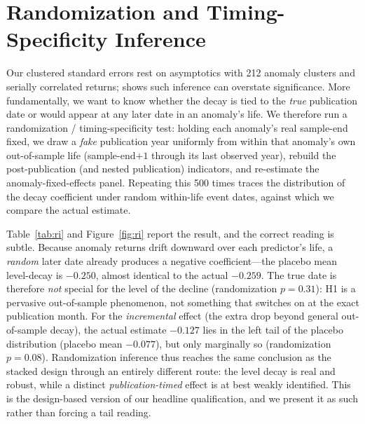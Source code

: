 \documentclass[12pt]{article}
\begin{document}
\section{Randomization and Timing-Specificity Inference}\label{sec:ri}
Our clustered standard errors rest on asymptotics with 212 anomaly clusters and serially
correlated returns; \citet{young2019} shows such inference can overstate significance. More
fundamentally, we want to know whether the decay is tied to the \emph{true} publication date or
would appear at any later date in an anomaly's life. We therefore run a randomization /
timing-specificity test: holding each anomaly's real sample-end fixed, we draw a \emph{fake}
publication year uniformly from within that anomaly's own out-of-sample life
(sample-end$+1$ through its last observed year), rebuild the post-publication (and nested
publication) indicators, and re-estimate the anomaly-fixed-effects panel. Repeating this 500
times traces the distribution of the decay coefficient under random within-life event dates,
against which we compare the actual estimate.

Table~\ref{tab:ri} and Figure~\ref{fig:ri} report the result, and the correct reading is
subtle. Because anomaly returns drift downward over each predictor's life, a \emph{random} later
date already produces a negative coefficient---the placebo mean level-decay is $-0.250$, almost
identical to the actual $-0.259$. The true date is therefore \emph{not} special for the level of
the decline (randomization $p=0.31$): H1 is a pervasive out-of-sample phenomenon, not something
that switches on at the exact publication month. For the \emph{incremental} effect (the extra
drop beyond general out-of-sample decay), the actual estimate $-0.127$ lies in the left tail of
the placebo distribution (placebo mean $-0.077$), but only marginally so (randomization
$p=0.08$). Randomization inference thus reaches the same conclusion as the stacked design
through an entirely different route: the level decay is real and robust, while a distinct
\emph{publication-timed} effect is at best weakly identified. This is the design-based version of
our headline qualification, and we present it as such rather than forcing a tail reading.
\end{document}
